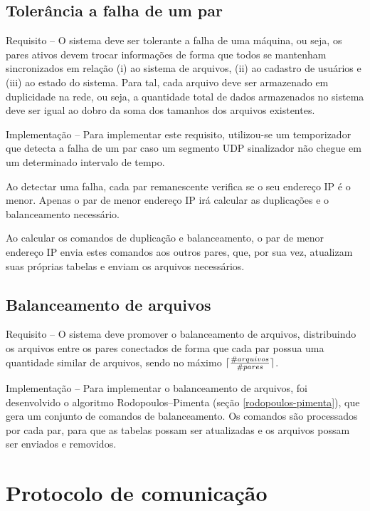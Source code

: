 \documentclass{article}
\DeclarePairedDelimiter{\ceil}{\lceil}{\rceil}
\begin{document}
\subsection{Tolerância a falha de um par}

\indent

Requisito -- O sistema deve ser tolerante a falha de uma máquina, ou seja, os pares ativos devem trocar informações de forma que todos se mantenham sincronizados em relação (i) ao sistema de arquivos, (ii) ao cadastro de usuários e (iii) ao estado do sistema. Para tal, cada arquivo deve ser armazenado em duplicidade na rede, ou seja, a quantidade total de dados armazenados no sistema deve ser igual ao dobro da soma dos tamanhos dos arquivos existentes.

Implementação -- Para implementar este requisito, utilizou-se um temporizador que detecta a falha de um par caso um segmento UDP sinalizador não chegue em um determinado intervalo de tempo.

Ao detectar uma falha, cada par remanescente verifica se o seu endereço IP é o menor. Apenas o par de menor endereço IP irá calcular as duplicações e o balanceamento necessário.

Ao calcular os comandos de duplicação e balanceamento, o par de menor endereço IP envia estes comandos aos outros pares, que, por sua vez, atualizam suas próprias tabelas e enviam os arquivos necessários.

\subsection{Balanceamento de arquivos}

\indent

Requisito -- O sistema deve promover o balanceamento de arquivos, distribuindo os arquivos entre os pares conectados de forma que cada par possua uma quantidade similar de arquivos, sendo no máximo $\ceil{\frac{\#arquivos}{\#pares}}$.

Implementação -- Para implementar o balanceamento de arquivos, foi desenvolvido o algoritmo Rodopoulos--Pimenta (seção \ref{rodopoulos-pimenta}), que gera um conjunto de comandos de balanceamento. Os comandos são processados por cada par, para que as tabelas possam ser atualizadas e os arquivos possam ser enviados e removidos.

\section{Protocolo de comunicação}
\end{document}
